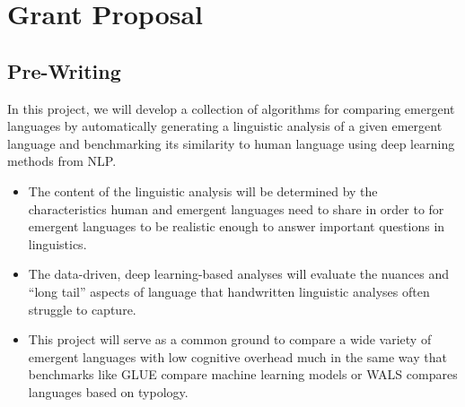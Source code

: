 \chapter{Grant Proposal}

\newpage
\section{Pre-Writing}


In this project, we will develop a collection of algorithms for comparing emergent languages by automatically
    generating a linguistic analysis of a given emergent language
    and benchmarking its similarity to human language using deep learning methods from NLP\@.
\begin{itemize}
    \item The content of the linguistic analysis will be determined by the characteristics human and emergent languages need to share in order to for emergent languages to be realistic enough to answer important questions in linguistics.
    \item The data-driven, deep learning-based analyses will evaluate the nuances and ``long tail'' aspects of language that handwritten linguistic analyses often struggle to capture.
    \item This project will serve as a common ground to compare a wide variety of emergent languages with low cognitive overhead much in the same way that
    benchmarks like GLUE compare machine learning models
    or WALS compares languages based on typology.
\end{itemize}

